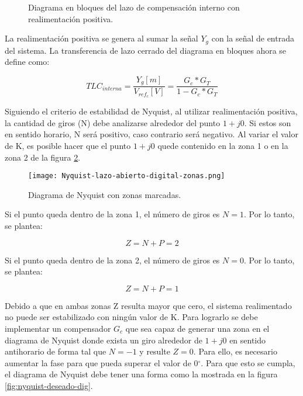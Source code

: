 \begin{figure}[H]
	\centering
	
	\caption{Diagrama en bloques del lazo de compensación interno con realimentación positiva.}	\label{fig:diag-interno_dig_realimentacion_positiva}
\end{figure}

La realimentación positiva se genera al sumar la señal $Y_g$ con la señal de entrada del sistema. La transferencia de lazo cerrado del diagrama en bloques ahora se define como:

\begin{equation}
	TLC_{interna}=\frac{Y_g[m]}{V_{ref_c}[V]}=\frac{G_c*G_T}{1-G_c*G_T}
\end{equation}

Siguiendo el criterio de estabilidad de Nyquist, al utilizar realimentación positiva, la cantidad de giros (N) debe analizarse alrededor del punto $1+j0$. Si estos son en sentido horario, N será positivo, caso contrario será negativo. Al variar el valor de K, es posible hacer que el punto $1+j0$ quede contenido en la zona 1 o en la zona 2 de la figura \ref{fig:nyquist-con-zonas_digital}. 

\begin{figure}[H]
	\centering
	\texttt{[image: Nyquist-lazo-abierto-digital-zonas.png]}
	\caption{Diagrama de Nyquist con zonas marcadas.}
	\label{fig:nyquist-con-zonas_digital}
\end{figure}

Si el punto queda dentro de la zona 1, el número de giros es $N=1$. Por lo tanto, se plantea:

\begin{equation*}
	Z = N + P = 2
\end{equation*}


Si el punto queda dentro de la zona 2, el número de giros es $N=0$. Por lo tanto, se plantea:

\begin{equation*}
	Z = N + P = 1
\end{equation*}

Debido a que en ambas zonas Z resulta mayor que cero, el sistema realimentado no puede ser estabilizado con ningún valor de K. Para lograrlo se debe implementar un compensador $G_c$ que sea capaz de generar una zona en el diagrama de Nyquist donde exista un giro alrededor de $1 + j0$ en sentido antihorario de forma tal que $N=-1$ y resulte $Z=0$. Para ello, es necesario aumentar la fase para que pueda superar el valor de 0$\mathrm{{}^\circ}$. Para que esto se cumpla, el diagrama de Nyquist debe tener una forma como la  mostrada en la figura \ref{fig:nyquist-deseado-dig}.

